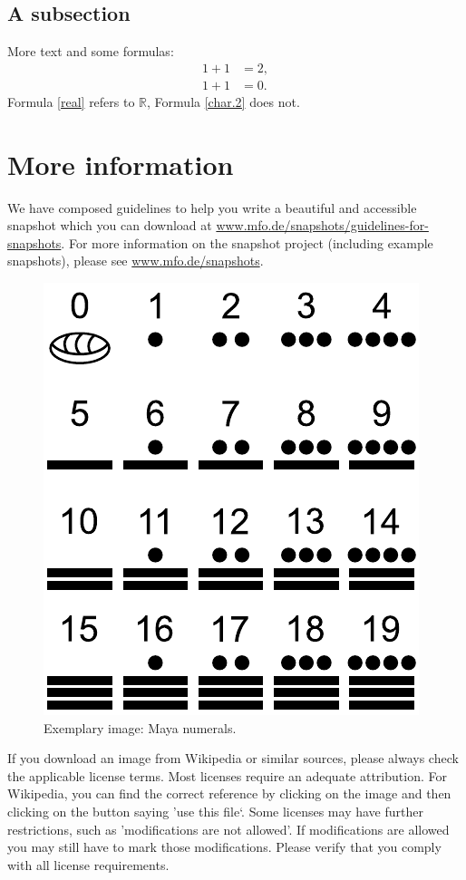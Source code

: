 \documentclass{snapshotmfo}
\begin{document}
\subsection{A subsection}
More text and some formulas:
\begin{align}\label{real}
1+1&=2,\\\label{char.2}
1+1&=0.
\end{align}
Formula \eqref{real} refers to $\mathbb{R}$, Formula \eqref{char.2} does not.

\section{More information}
We have composed guidelines to help you write a beautiful and accessible snapshot which you can download at \href{https://www.mfo.de/snapshots/guidelines-for-snapshots}{www.mfo.de/snapshots/guidelines-for-snapshots}. For more information on the snapshot project (including example snapshots), please see \href{https://www.mfo.de/snapshots}{www.mfo.de/snapshots}.

\begin{figure}[ht]
        \centering
        \includegraphics[width= 0.33 \textwidth]{maya.pdf}
        \caption{Exemplary image: Maya numerals.}
\label{fig:maya}
\end{figure}

If you download an image from Wikipedia or similar sources, please always check the applicable license terms. Most licenses require an adequate attribution. For Wikipedia, you can find the correct reference by clicking on the image and then clicking on the button saying 'use this file‘. Some licenses may have further restrictions, such as 'modifications are not allowed'. If modifications are allowed you may still have to mark those modifications. Please verify that you comply with all license requirements.
\end{document}

